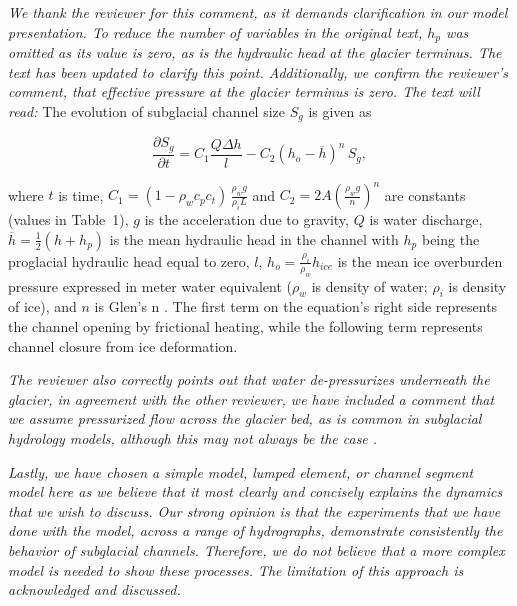 \documentclass[11pt]{article}
\begin{document}
\begin{itemize}
  \textit{We thank the reviewer for this comment, as it demands clarification in our model presentation. To reduce the number of variables in the original text, $h_p$ was omitted as its value is zero, as is the hydraulic head at the glacier terminus. The text has been updated to clarify this point.
    Additionally, we confirm the reviewer's comment, that effective pressure at the glacier terminus is zero. The text will read:}
  The evolution of subglacial channel size $S_g$ is given as
  \begin{linenomath*}
    \begin{equation}
      \label{eq:dS_dt}
      \frac{\partial S_g}{\partial t} = C_1 \frac{Q \Delta h}{l} - C_2 \left(h_{o}-\overline{h}\right)^n\,S_g,
    \end{equation}
  \end{linenomath*}
  \noindent where $t$ is time, $C_1= (1-\rho_wc_pc_t)\,\frac{\rho_wg}{\rho_iL}$ and $C_2=2A(\frac{\rho_wg}{n})^n$ are constants (values in Table~1), $g$ is the acceleration due to gravity, $Q$ is water discharge, $\overline{h}=\frac{1}{2}(h+h_p)$ is the mean hydraulic head in the channel with $h_p$ being the proglacial hydraulic head equal to zero, $l$, $h_{o}= \frac{\rho_i}{\rho_w} h_{ice}$ is the mean ice overburden pressure expressed in meter water equivalent ($\rho_w$ is density of water; $\rho_i$ is density of ice), and $n$ is Glen's n \citep[usually $n=3$; ][]{glen1955}.
  The first term on the equation's right side represents the channel opening by frictional heating, while the following term represents channel closure from ice deformation.


  \textit{
    The reviewer also correctly points out that water de-pressurizes underneath the glacier, in agreement with the other reviewer, we have included a comment that we assume pressurized flow across the glacier bed, as is common in subglacial hydrology models, although this may not always be the case \citep{perolo2018}.
  }
  
  \textit{Lastly, we have chosen a simple model, lumped element, or channel segment model here as we believe that it most clearly and concisely explains the dynamics that we wish to discuss.
    Our strong opinion is that the experiments that we have done with the model, across a range of hydrographs, demonstrate consistently the behavior of subglacial channels.
    Therefore, we do not believe that a more complex model is needed to show these processes.
    The limitation of this approach is acknowledged and discussed.
  }


\end{itemize}
\end{document}
